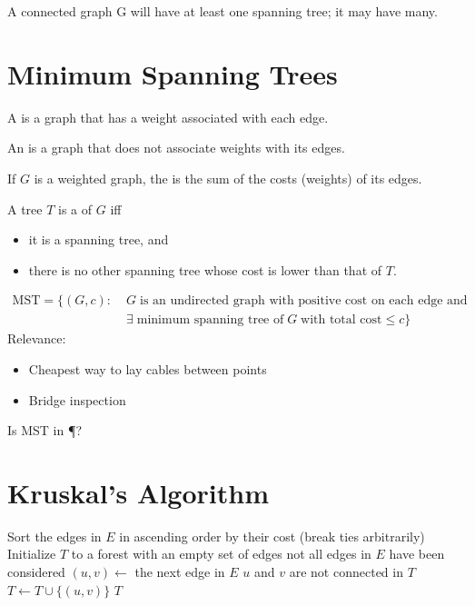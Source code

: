 \documentclass[a4paper]{report}
\newcommand{\bookref}[3]{\marginpar{\faBook{}~#1\\Chapter #2\\Section #3}}
\theoremstyle{definition}
\begin{document}

A connected graph G will have at least one spanning tree; it may have many.

\section{Minimum Spanning Trees}
\bookref{ER}{28}{28.1.6}
A  is a graph that has a weight associated with each edge. 

An  is a graph that does not associate weights with its edges.  

If $G$ is a weighted graph, the  is the sum of the costs (weights) of its edges. 

A tree $T$ is a  of $G$ iff
\begin{itemize}
\item it is a spanning tree, and
\item there is no other spanning tree whose cost is lower than that of $T$.
\end{itemize}
%
\begin{align*}
\text{MST} = \{(G, c) : & \; G \; \text{is an undirected graph with positive cost on each edge and}\\ & \; \exists \; \text{minimum spanning tree of} \; G \; \text{with total cost} \leq c \}
\end{align*}
%
Relevance:
\begin{itemize}
\item Cheapest way to lay cables between points
\item Bridge inspection
\end{itemize}

Is MST in \P?

\section{Kruskal's Algorithm}
\bookref{ER}{28}{28.1.6}
\begin{codebox}
\li Sort the edges in $E$ in ascending order by their cost (break ties arbitrarily)
\li Initialize $T$ to a forest with an empty set of edges
\li \While not all edges in $E$ have been considered \Do
  \li $(u,v) \gets$ the next edge in $E$
  \li \If $u$ and $v$ are not connected in $T$ 
    \li \Then $T \gets T \cup \{ (u,v) \}$
    \End
\End
\li \Return $T$
\end{codebox}
\end{document}
